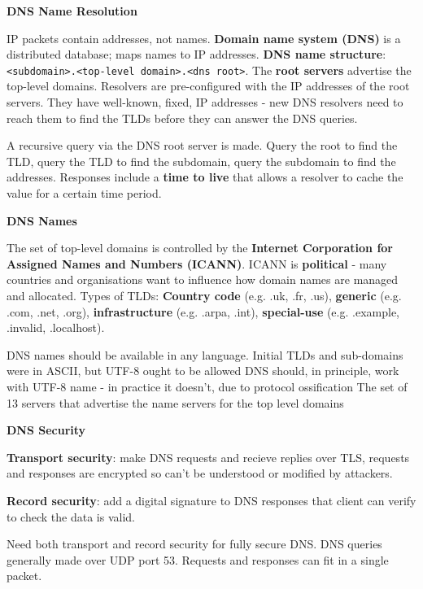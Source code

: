 \documentclass{article}
\begin{document}
\vspace{\baselineskip}
\textbf{DNS Name Resolution}

IP packets contain addresses, not names.
\textbf{Domain name system (DNS)} is a distributed database; maps names to IP addresses.
\textbf{DNS name structure}: \texttt{<subdomain>.<top-level domain>.<dns root>}.
The \textbf{root servers} advertise the top-level domains.
Resolvers are pre-configured with the IP addresses of the root servers.
They have well-known, fixed, IP addresses {-} new DNS resolvers need to reach them to find the TLDs before they can answer the DNS queries.

A recursive query via the DNS root server is made. Query the root to find the TLD, query the TLD to find the subdomain,
query the subdomain to find the addresses.
Responses include a \textbf{time to live} that allows a resolver to cache the value for a certain time period.

\vspace{\baselineskip}
\textbf{DNS Names}

The set of top-level domains is controlled by the \textbf{Internet Corporation for Assigned Names and Numbers (ICANN)}.
ICANN is \textbf{political} {-} many countries and organisations want to influence how domain names are managed and allocated.
Types of TLDs:
\textbf{Country code} (e.g. {.}uk, {.}fr, {.}us),
\textbf{generic} (e.g. {.}com, {.}net, {.}org),
\textbf{infrastructure} (e.g. {.}arpa, {.}int),
\textbf{special-use} (e.g. {.}example, {.}invalid, {.}localhost).

DNS names should be available in any language. Initial TLDs and sub-domains were in ASCII, but UTF-8 ought to be allowed
DNS should, in principle, work with UTF-8 name {-} in practice it doesn't, due to protocol ossification
The set of 13 servers that advertise the name servers for the top level domains

\vspace{\baselineskip}
\textbf{DNS Security}

\textbf{Transport security}: make DNS requests and recieve replies over TLS, requests and responses are encrypted so can't be understood or modified by attackers.

\textbf{Record security}: add a digital signature to DNS responses that client can verify to check the data is valid.

Need both transport and record security for fully secure DNS\@.
DNS queries generally made over UDP port 53. Requests and responses can fit in a single packet.
\end{document}
